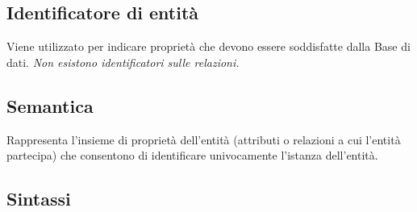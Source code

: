 \documentclass[a4paper, 10pt]{article}
\theoremstyle{definition}
\begin{document}
			\newpage
			
			\subsection{Identificatore di entità}
				Viene utilizzato per indicare proprietà che devono essere soddisfatte dalla Base di dati.
				\textit{Non esistono identificatori sulle relazioni.}
				\subsection*{Semantica}
					Rappresenta l'insieme di proprietà dell'entità (attributi o relazioni a cui l'entità partecipa) che consentono di identificare univocamente l'istanza dell'entità.
				\subsection*{Sintassi}
\end{document}
